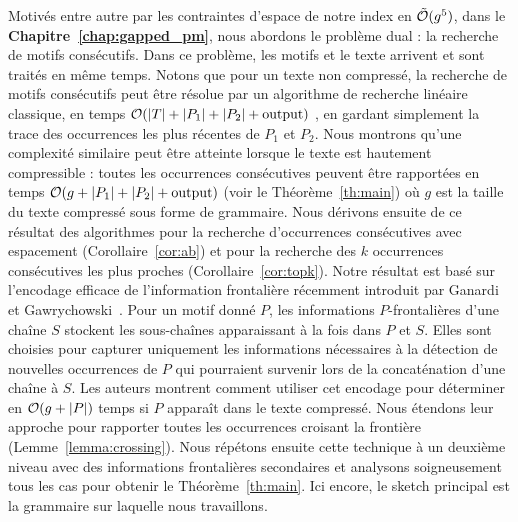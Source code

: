 Motivés entre autre par les contraintes d'espace de notre index en $\tilde {\mathcal{O}}(g^5)$, dans le \textbf{Chapitre~\ref{chap:gapped_pm}}, nous abordons le problème dual : la recherche de motifs consécutifs. Dans ce problème, les motifs et le texte arrivent et sont traités en même temps. Notons que pour un texte non compressé, la recherche de motifs consécutifs peut être résolue par un algorithme de recherche linéaire classique, en temps $\mathcal{O}(|T|+|P_1|+|P_2|+\mathrm{output})$ , en gardant simplement la trace des occurrences les plus récentes de $P_1$ et $P_2$.
Nous montrons qu'une complexité similaire peut être atteinte lorsque le texte est hautement compressible : toutes les occurrences consécutives peuvent être rapportées en temps $\mathcal{O}(g+|P_1|+|P_2|+\mathrm{output})$ (voir le Théorème~\ref{th:main}) où $g$ est la taille du texte compressé sous forme de grammaire. Nous dérivons ensuite de ce résultat des algorithmes pour la recherche d'occurrences consécutives avec espacement (Corollaire~\ref{cor:ab}) et pour la recherche des $k$ occurrences consécutives les plus proches (Corollaire~\ref{cor:topk}).
%
Notre résultat est basé sur l'encodage efficace de \og{}l'information frontalière\fg{} récemment introduit par Ganardi et Gawrychowski~\cite{DBLP:conf/soda/GanardiG22}. Pour un motif donné $P$, les informations $P$-frontalières d'une chaîne $S$ stockent les sous-chaînes apparaissant à la fois dans $P$ et $S$. Elles sont choisies pour capturer uniquement les informations nécessaires à la détection de nouvelles occurrences de $P$ qui pourraient survenir lors de la concaténation d'une chaîne à $S$. 
%
Les auteurs montrent comment utiliser cet encodage pour déterminer en $\mathcal{O}(g+|P|)$ temps si $P$ apparaît dans le texte compressé. Nous étendons leur approche pour rapporter toutes les occurrences croisant la frontière (Lemme~\ref{lemma:crossing}). Nous répétons ensuite cette technique à un deuxième niveau avec des \og{}informations frontalières secondaires\fg{} et analysons soigneusement tous les cas pour obtenir le Théorème~\ref{th:main}. Ici encore, le sketch principal est la grammaire sur laquelle nous travaillons.\\


